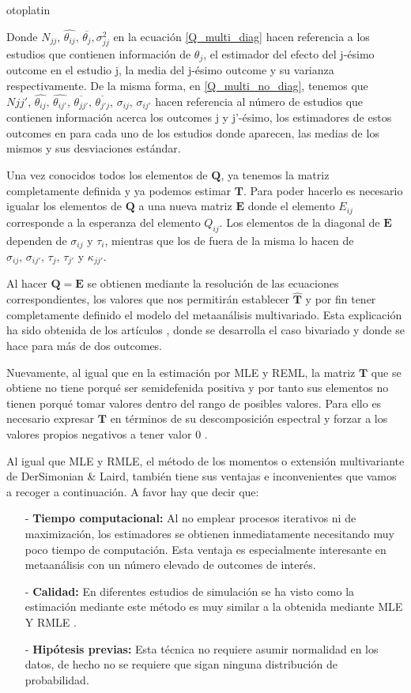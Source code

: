 otoplatin\documentclass[a4paper,openright,12pt]{report}
\begin{document}
{Donde $N_{jj},\, \widehat{\theta_{ij}},\, \overline{\theta_{j}}, \sigma_{jj}^{2}$ en la ecuación \ref{Q_multi_diag}} hacen referencia a los estudios que contienen información de $\theta_{j}$, el estimador del efecto del j-ésimo outcome en el estudio j, la media del j-ésimo outcome  y su varianza respectivamente. De la misma forma, en \ref{Q_multi_no_diag}, tenemos que $N{jj'},\, \widehat{\theta_{ij}},\, \widehat{\theta_{ij'}},\, \overline{\theta_{jj'}},\, \overline{\theta_{j'j}},\, \sigma_{ij},\, \sigma_{ij'}$ hacen referencia al número de estudios que contienen información acerca los outcomes j y j'-ésimo, los estimadores de estos outcomes en para cada uno de los estudios donde aparecen, las medias de los mismos y sus desviaciones estándar.

Una vez conocidos todos los elementos de $\mathbf{Q}$, ya tenemos la matriz completamente definida y ya podemos estimar $\mathbf{T}$. Para poder hacerlo es necesario igualar los elementos de $\mathbf{Q}$ a una nueva matriz $\mathbf{E}$ donde el elemento $E_{ij}$ corresponde a la esperanza del elemento $Q_{ij}$. Los elementos de la diagonal de $\mathbf{E}$ dependen de $\sigma_{ij}$ y $\tau_{i}$, mientras que los de fuera de la misma lo hacen de $\sigma_{ij},\, \sigma_{ij'},\, \tau_{j},\, \tau_{j'}$ y $\kappa_{jj'}$.

Al hacer $\mathbf{Q}=\mathbf{E}$ se obtienen mediante la resolución de las ecuaciones correspondientes, los valores que nos permitirán establecer $\mathbf{\widehat{T}}$ y por fin tener completamente definido el modelo del metaanálisis multivariado. Esta explicación ha sido obtenida de los artículos \cite{Jackson2010}, donde se desarrolla el caso bivariado y \cite{Mavridis2011} donde se hace para más de dos outcomes.

Nuevamente, al igual que en la estimación por MLE y REML, la matriz $\mathbf{T}$ que se obtiene no tiene porqué ser semidefenida positiva y por tanto sus elementos no tienen porqué tomar valores dentro del rango de posibles valores. Para ello es necesario expresar $\mathbf{T}$ en términos de su descomposición espectral y forzar a los valores propios negativos a tener valor 0 \cite{Jackson2010}.

Al igual que MLE y RMLE, el método de los momentos o extensión multivariante de DerSimonian \& Laird, también tiene sus ventajas e inconvenientes que vamos a recoger a continuación. A favor hay que decir que:
\begin{itemize}
\item[-] \textbf{Tiempo computacional:} Al no emplear procesos iterativos ni de maximización, los estimadores se obtienen inmediatamente necesitando muy poco tiempo de computación. Esta ventaja es especialmente interesante en metaanálisis con un número elevado de outcomes de interés.
\item[-] \textbf{Calidad:} En diferentes estudios de simulación se ha visto como la estimación mediante este método es muy similar a la obtenida mediante MLE Y RMLE \cite{Jackson2011}.
\item[-] \textbf{Hipótesis previas:} Esta técnica no requiere asumir normalidad en los datos, de hecho no se requiere que sigan ninguna distribución de probabilidad.
\end{itemize}
\end{document}
